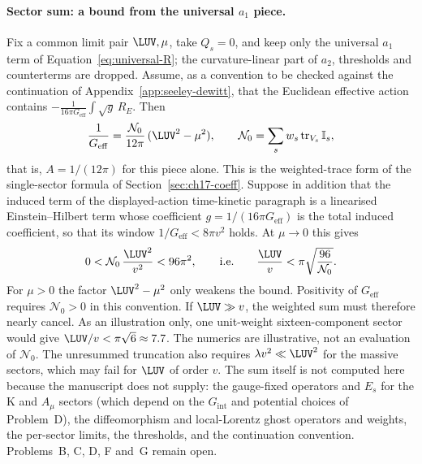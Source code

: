 \paragraph{Sector sum: a bound from the universal \(a_1\) piece.}
Fix a common limit pair \(\LUV,\mu\), take \(Q_s=0\), and keep only the
universal \(a_1\) term of Equation~\eqref{eq:universal-R}; the
curvature-linear part of \(a_2\), thresholds and counterterms are
dropped. Assume, as a convention to be checked against the
continuation of Appendix~\ref{app:seeley-dewitt}, that the Euclidean
effective action contains
\(-\tfrac{1}{16\pi G_{\mathrm{eff}}}\int\sqrt g\,R_E\). Then
\[
  \frac1{G_{\mathrm{eff}}}
  =\frac{\mathcal N_0}{12\pi}\,(\LUV^2-\mu^2),
  \qquad
  \mathcal N_0=\sum_{s}w_s\operatorname{tr}_{V_s}\mathbb I_s ,
\]
that is, \(A=1/(12\pi)\) for this piece alone. This is the
weighted-trace form of the single-sector formula of
Section~\ref{sec:ch17-coeff}. Suppose in addition that the induced term
of the displayed-action time-kinetic paragraph is a linearised
Einstein--Hilbert term whose coefficient \(g=1/(16\pi G_{\mathrm{eff}})\)
is the total induced coefficient, so that its window
\(1/G_{\mathrm{eff}}<8\pi v^2\) holds. At \(\mu\to0\) this gives
\[
  0<\mathcal N_0\,\frac{\LUV^2}{v^2}<96\pi^2,
  \qquad\text{i.e.}\qquad
  \frac{\LUV}{v}<\pi\sqrt{\frac{96}{\mathcal N_0}} .
\]
For \(\mu>0\) the factor \(\LUV^2-\mu^2\) only weakens the bound.
Positivity of \(G_{\mathrm{eff}}\) requires \(\mathcal N_0>0\) in this
convention. If \(\LUV\gg v\), the weighted sum must therefore nearly
cancel. As an illustration only, one unit-weight sixteen-component
sector would give \(\LUV/v<\pi\sqrt6\approx7.7\). The numerics are
illustrative, not an evaluation of \(\mathcal N_0\). The unresummed
truncation also requires \(\lambda v^2\ll\LUV^2\) for the massive
sectors, which may fail for \(\LUV\) of order \(v\). The sum itself is
not computed here because the manuscript does not supply: the
gauge-fixed operators and \(E_s\) for the \(\mathrm K\) and
\(A_\mu\) sectors (which depend on the \(G_{\mathrm{int}}\) and
potential choices of Problem~D), the diffeomorphism and local-Lorentz
ghost operators and weights, the per-sector limits, the thresholds,
and the continuation convention. Problems~B, C, D, F and~G remain open.

